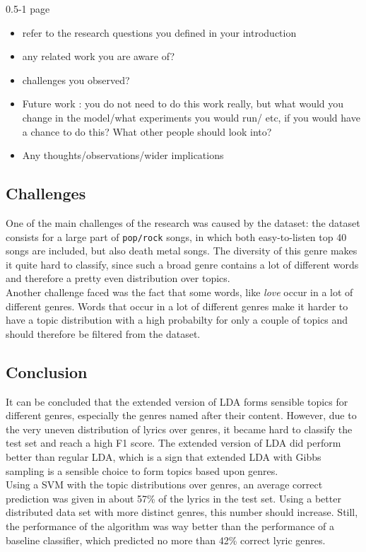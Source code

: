 0.5-1 page
\begin{itemize}
\item refer to the research questions you defined in your introduction
\item any related work you are aware of?
\item challenges you observed?
\item Future work : you do not need to do this work really, but what would you change in the model/what experiments you would run/ etc, if you would have a chance to do this? What other people should look into?
\item Any thoughts/observations/wider implications
\end{itemize}

\subsection{Challenges}
One of the main challenges of the research was caused by the dataset: the dataset consists for a large part of \verb|pop/rock| songs, in which both easy-to-listen top 40 songs are included, but also death metal songs. The diversity of this genre makes it quite hard to classify, since such a broad genre contains a lot of different words and therefore a pretty even distribution over topics. \\
Another challenge faced was the fact that some words, like \textit{love} occur in a lot of different genres. Words that occur in a lot of different genres make it harder to have a topic distribution with a high probabilty for only a couple of topics and should therefore be filtered from the dataset. 

\subsection{Conclusion}
It can be concluded that the extended version of LDA forms sensible topics for different genres, especially the genres named after their content. However, due to the very uneven distribution of lyrics over genres, it became hard to classify the test set and reach a high F1 score. The extended version of LDA did perform better than regular LDA, which is a sign that extended LDA with Gibbs sampling is a sensible choice to form topics based upon genres. \\
Using a SVM with the topic distributions over genres, an average correct prediction was given in about 57\% of the lyrics in the test set. Using a better distributed data set with more distinct genres, this number should increase. Still, the performance of the algorithm was way better than the performance of a baseline classifier, which predicted no more than 42\% correct lyric genres.


